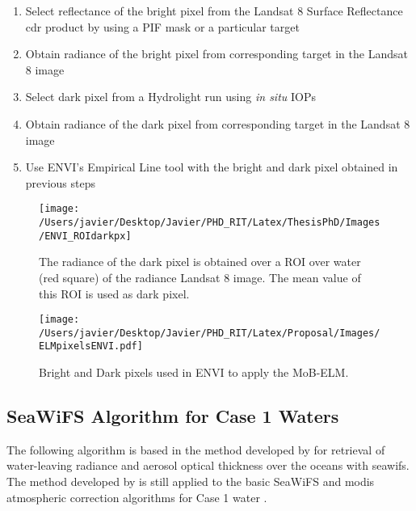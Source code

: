 \begin{enumerate}[itemsep=2pt,parsep=2pt]
  \item Select reflectance of the bright pixel from the Landsat 8 Surface Reflectance \gls{cdr} product by using a PIF mask or a particular target
  \item Obtain radiance of the bright pixel from corresponding target in the Landsat 8 image
  \item Select dark pixel from a Hydrolight run using {\it in situ} IOPs
  \item Obtain radiance of the dark pixel from corresponding target in the Landsat 8 image
  \item Use ENVI's Empirical Line tool with the bright and dark pixel obtained in previous steps
\end{enumerate}

\begin{figure}[htb]
    \centering
    \texttt{[image: /Users/javier/Desktop/Javier/PHD\_RIT/Latex/ThesisPhD/Images/ENVI\_ROIdarkpx]}
  \caption{The radiance of the dark pixel is obtained over a ROI over water (red square) of the radiance Landsat 8 image. The mean value of this ROI is used as dark pixel.\label{fig:ENVIROI_darkpx} } 
\end{figure}
\begin{figure}[htb]
  \centering
  \texttt{[image: /Users/javier/Desktop/Javier/PHD\_RIT/Latex/Proposal/Images/ELMpixelsENVI.pdf]}
  \caption{Bright and Dark pixels used in ENVI to apply the MoB-ELM. \label{fig:ELMpxsENVI} } 
\end{figure}

\subsection{SeaWiFS Algorithm for Case 1 Waters}
\label{subsec:gordon}
The following algorithm is based in the method developed by \cite{Gordon:1994} for retrieval of water-leaving radiance and aerosol optical thickness over the oceans with \gls{seawifs}. The method developed by \cite{Gordon:1994} is still applied to the basic SeaWiFS and \gls{modis} atmospheric correction algorithms for Case 1 water \cite{IOCCG:2010}.

